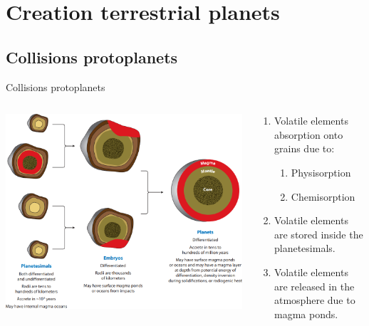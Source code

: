 \documentclass[11pt, aspectratio=169]{beamer}
\begin{document}
\section{Creation terrestrial planets}
\subsection{Collisions protoplanets}
\begin{frame}[t]{Collisions protoplanets}
	\begin{columns}
	\begin{column}{0.5\textwidth}
     	\includegraphics[height=.85\textheight]{figures/protoplanets.png} 
	\end{column}
	\begin{column}{0.5\textwidth}
	\begin{enumerate}
		\item Volatile elements absorption onto grains due to:
		\begin{enumerate}
			\item Physisorption\\
			\item Chemisorption\\
		\end{enumerate}
		\item Volatile elements are stored inside the planetesimals.\\
		\item Volatile elements are released in the atmosphere due to magma ponds.\\
	\end{enumerate}
	\vspace{3cm}
	\end{column}
	\end{columns}	
\end{frame}
\end{document}
